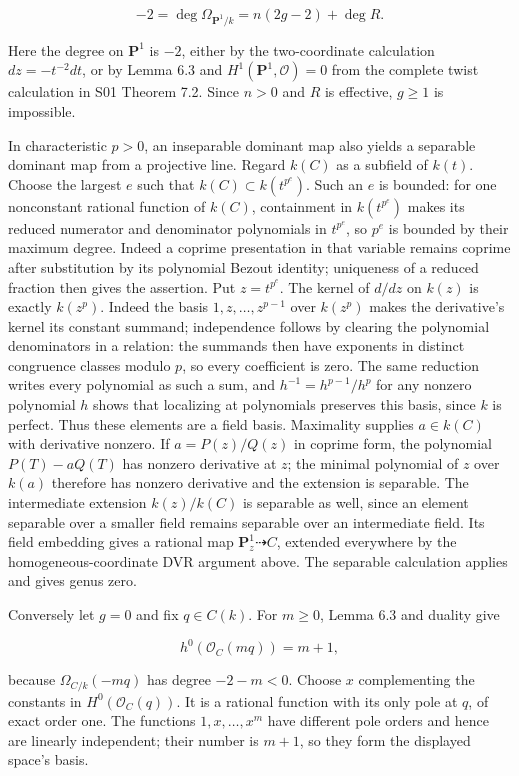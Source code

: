 \documentclass[11pt,a4paper,openany]{report}
\begin{document}
\[
-2=\deg\Omega_{\mathbf P^1/k}
=n(2g-2)+\deg R.
\]

Here the degree on \(\mathbf P^1\) is \(-2\), either by the two-coordinate calculation \(dz=-t^{-2}dt\), or by Lemma 6.3 and \(H^1(\mathbf P^1,\mathcal O)=0\) from the complete twist calculation in S01 Theorem 7.2. Since \(n>0\) and \(R\) is effective, \(g\geq1\) is impossible.

In characteristic \(p>0\), an inseparable dominant map also yields a separable dominant map from a projective line. Regard \(k(C)\) as a subfield of \(k(t)\). Choose the largest \(e\) such that \(k(C)\subset k(t^{p^e})\). Such an \(e\) is bounded: for one nonconstant rational function of \(k(C)\), containment in \(k(t^{p^e})\) makes its reduced numerator and denominator polynomials in \(t^{p^e}\), so \(p^e\) is bounded by their maximum degree. Indeed a coprime presentation in that variable remains coprime after substitution by its polynomial Bezout identity; uniqueness of a reduced fraction then gives the assertion. Put \(z=t^{p^e}\). The kernel of \(d/dz\) on \(k(z)\) is exactly \(k(z^p)\). Indeed the basis \(1,z,\ldots,z^{p-1}\) over \(k(z^p)\) makes the derivative's kernel its constant summand; independence follows by clearing the polynomial denominators in a relation: the summands then have exponents in distinct congruence classes modulo \(p\), so every coefficient is zero. The same reduction writes every polynomial as such a sum, and \(h^{-1}=h^{p-1}/h^p\) for any nonzero polynomial \(h\) shows that localizing at polynomials preserves this basis, since \(k\) is perfect. Thus these elements are a field basis. Maximality supplies \(a\in k(C)\) with derivative nonzero. If \(a=P(z)/Q(z)\) in coprime form, the polynomial \(P(T)-aQ(T)\) has nonzero derivative at \(z\); the minimal polynomial of \(z\) over \(k(a)\) therefore has nonzero derivative and the extension is separable. The intermediate extension \(k(z)/k(C)\) is separable as well, since an element separable over a smaller field remains separable over an intermediate field. Its field embedding gives a rational map \(\mathbf P^1_z\dashrightarrow C\), extended everywhere by the homogeneous-coordinate DVR argument above. The separable calculation applies and gives genus zero.

Conversely let \(g=0\) and fix \(q\in C(k)\). For \(m\geq0\), Lemma 6.3 and duality give

\[
h^0(\mathcal O_C(mq))=m+1,
\]

because \(\Omega_{C/k}(-mq)\) has degree \(-2-m<0\). Choose \(x\) complementing the constants in \(H^0(\mathcal O_C(q))\). It is a rational function with its only pole at \(q\), of exact order one. The functions \(1,x,\ldots,x^m\) have different pole orders and hence are linearly independent; their number is \(m+1\), so they form the displayed space's basis.
\end{document}
